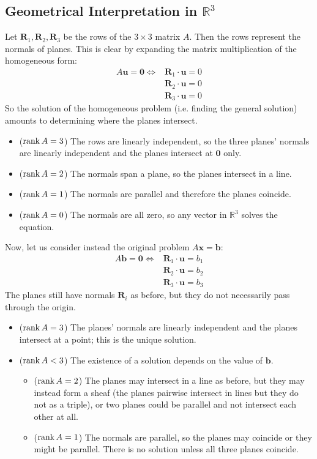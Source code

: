 \documentclass{article}
\begin{document}
	\subsection{Geometrical Interpretation in $\mathbb R^3$}
	Let $\bm R_1, \bm R_2, \bm R_3$ be the rows of the $3 \times 3$ matrix $A$. Then the rows represent the normals of planes. This is clear by expanding the matrix multiplication of the homogeneous form:
	\begin{align*}
		A\bm u = \bm 0 \iff & \bm R_1 \cdot \bm u = 0 \\
		&\bm R_2 \cdot \bm u = 0 \\
		&\bm R_3 \cdot \bm u = 0
	\end{align*}
	So the solution of the homogeneous problem (i.e. finding the general solution) amounts to determining where the planes intersect.
	\begin{itemize}
		\item ($\rank A = 3$) The rows are linearly independent, so the three planes' normals are linearly independent and the planes intersect at $\bm 0$ only.
		\item ($\rank A = 2$) The normals span a plane, so the planes intersect in a line.
		\item ($\rank A = 1$) The normals are parallel and therefore the planes coincide.
		\item ($\rank A = 0$) The normals are all zero, so any vector in $\mathbb R^3$ solves the equation.
	\end{itemize}
	Now, let us consider instead the original problem $A \bm x = \bm b$:
	\begin{align*}
		A\bm b = \bm 0 \iff & \bm R_1 \cdot \bm u = b_1 \\
		&\bm R_2 \cdot \bm u = b_2 \\
		&\bm R_3 \cdot \bm u = b_3
	\end{align*}
	The planes still have normals $\bm R_i$ as before, but they do not necessarily pass through the origin.
	\begin{itemize}
		\item ($\rank A = 3$) The planes' normals are linearly independent and the planes intersect at a point; this is the unique solution.
		\item ($\rank A < 3$) The existence of a solution depends on the value of $\bm b$.
		\begin{itemize}
			\item ($\rank A = 2$) The planes may intersect in a line as before, but they may instead form a sheaf (the planes pairwise intersect in lines but they do not as a triple), or two planes could be parallel and not intersect each other at all.
			\item ($\rank A = 1$) The normals are parallel, so the planes may coincide or they might be parallel. There is no solution unless all three planes coincide.
		\end{itemize}
	\end{itemize}
\end{document}
